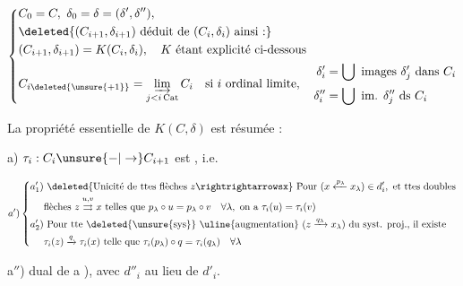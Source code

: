 
\[
\left\{\begin{aligned}
&C_0=C,\ \delta_0=\delta=(\delta',\delta''),\\
&\deleted{(C_{i+1},\delta_{i+1})\text{ déduit de }(C_i,\delta_i)\text{ ainsi :}}\\
&(C_{i+1},\delta_{i+1})=K(C_i,\delta_i),\quad K\text{ étant explicité ci-dessous}\\
&C_{i\deleted{\unsure{+1}}}=\varinjlim_{j<i\,\mathrm{Cat}} C_i\quad\text{si }i\text{ ordinal limite},\quad
\begin{aligned}\delta_i'&=\bigcup\text{ images }\delta_j'\text{ dans } C_i\\
\delta_i''&=\bigcup\text{ im. }\delta_j''\text{ ds }C_i\end{aligned}
\end{aligned}\right.
\]


La propriété essentielle de $K(C,\delta)$  est résumée  :

a) $\tau_i:C_i\unsure{-|\to}C_{i+1}$ est  , i.e.

\[
a')\left\{\begin{aligned}
a'_1)&\ \deleted{\text{Unicité de ttes flèches }z\rightrightarrowsx}\ \text{Pour }(x\xleftarrow{p_\lambda}x_\lambda)\in d'_i,\text{ et ttes doubles}\\
&\text{flèches }z\overset{u,v}{\rightrightarrows}x\text{ telles que }p_\lambda\circ u=p_\lambda\circ v\quad\forall\lambda,\text{ on a }\tau_i(u)=\tau_i(v)\\
a'_2)&\ \text{Pour tte }\deleted{\unsure{\text{sys}}}\ \text{\uline{augmentation} }(z\xrightarrow{q_\lambda}x_\lambda)\text{ du syst. proj., il existe}\\
&\tau_i(z)\xrightarrow{q}\tau_i(x)\text{ telle que }\tau_i(p_\lambda)\circ q=\tau_i(q_\lambda)\quad\forall\lambda
\end{aligned}\right.
\]

a$''$)  dual de a ), avec $d''_i$ au lieu de $d'_i$.


